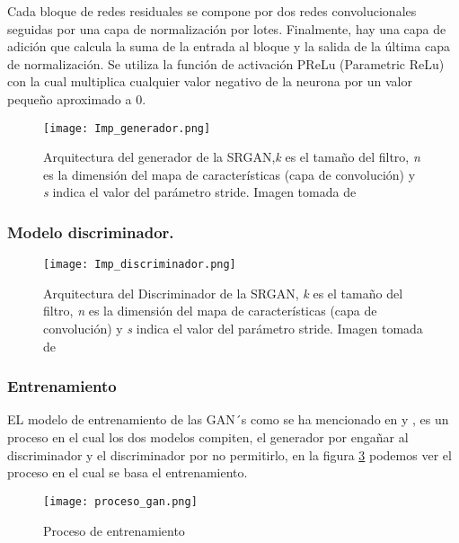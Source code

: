 Cada bloque de redes residuales se compone por dos redes convolucionales
seguidas por una capa de normalización por lotes. Finalmente, hay una
capa de adición que calcula la suma de la entrada al bloque y la salida
de la última capa de normalización. Se utiliza la función de activación
PReLu (Parametric ReLu) con la cual multiplica cualquier valor negativo de la neurona
por un valor pequeño aproximado a 0.





\begin{figure}[H]
  \begin{center}
    \texttt{[image: Imp\_generador.png]}
    \caption{Arquitectura del generador de la SRGAN,\emph{k} es el tamaño del
    filtro, \emph{n} es la dimensión del mapa de características (capa de convolución) y \emph{s} indica
    el valor del parámetro stride. Imagen tomada de \cite{SRGAN}}
    \label{Alexis4}
  \end{center}
\end{figure}

\subsubsection{Modelo discriminador.}

\begin{figure}[H]
  \begin{center}
    \texttt{[image: Imp\_discriminador.png]}
    \caption{Arquitectura del Discriminador de la SRGAN, \emph{k} es el tamaño
    del filtro, \emph{n} es la dimensión del mapa de características (capa de convolución) y \emph{s}
    indica el valor del parámetro stride. Imagen tomada de \cite{SRGAN}}
    \label{Alexis5}
  \end{center}
\end{figure}

\subsubsection{Entrenamiento}

EL modelo de entrenamiento de las GAN´s como se ha mencionado en \cite{GANs} y \cite{SRGAN}, es un proceso en el cual
los dos modelos compiten, el generador por engañar al discriminador y el discriminador por no permitirlo, en la figura \ref{Alexis6}
podemos ver el proceso en el cual se basa el entrenamiento.

\begin{figure}[H]
    \begin{center}
      \texttt{[image: proceso\_gan.png]}
      \caption{Proceso de entrenamiento}
      \label{Alexis6}
    \end{center}
\end{figure}


